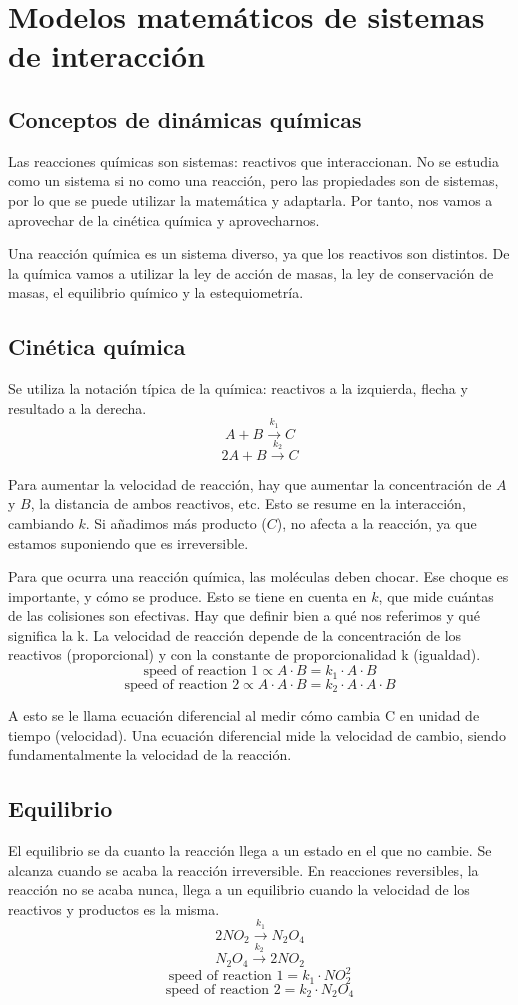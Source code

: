 \section{Modelos matemáticos de sistemas de interacción}
\subsection{Conceptos de dinámicas químicas}
Las reacciones químicas son sistemas: reactivos que interaccionan. No se estudia como un sistema si no como una reacción, pero las propiedades son de sistemas, por lo que se puede utilizar la matemática y adaptarla. Por tanto, nos vamos a aprovechar de la cinética química y aprovecharnos. 

Una reacción química es un sistema diverso, ya que los reactivos son distintos. De la química vamos a utilizar la ley de acción de masas, la ley de conservación de masas, el equilibrio químico y la estequiometría. 

\subsection{Cinética química}
Se utiliza la notación típica de la química: reactivos a la izquierda, flecha y resultado a la derecha. 
$$A + B \xrightarrow{k_1} C$$
$$2A + B \xrightarrow{k_2} C$$

Para aumentar la velocidad de reacción, hay que aumentar la concentración de $A$ y $B$, la distancia de ambos reactivos, etc. Esto se resume en la interacción, cambiando $k$. Si añadimos más producto ($C$), no afecta a la reacción, ya que estamos suponiendo que es irreversible.

Para que ocurra una reacción química, las moléculas deben chocar. Ese choque es importante, y cómo se produce. Esto se tiene en cuenta en $k$, que mide cuántas de las colisiones son efectivas. Hay que definir bien a qué nos referimos y qué significa la k. La velocidad de reacción depende de la concentración de los reactivos (proporcional) y con la constante de proporcionalidad k (igualdad). 
$$\text{speed of reaction 1} \propto A \cdot B = k_1 \cdot A \cdot B$$
$$\text{speed of reaction 2} \propto A \cdot A \cdot B = k_2 \cdot A \cdot A \cdot B $$

A esto se le llama ecuación diferencial al medir cómo cambia C en unidad de tiempo (velocidad). Una ecuación diferencial mide la velocidad de cambio, siendo fundamentalmente la velocidad de la reacción. 

\subsection{Equilibrio}
El equilibrio se da cuanto la reacción llega a un estado en el que no cambie. Se alcanza cuando se acaba la reacción irreversible. En reacciones reversibles, la reacción no se acaba nunca, llega a un equilibrio cuando la velocidad de los reactivos y productos es la misma.
$$2NO_2 \xrightarrow{k_1} N_2O_4$$
$$N_2O_4 \xrightarrow{k_2} 2NO_2 $$
$$\text{speed of reaction 1} = k_1 \cdot NO_2^2$$
$$\text{speed of reaction 2} = k_2 \cdot N_2O_4 $$

